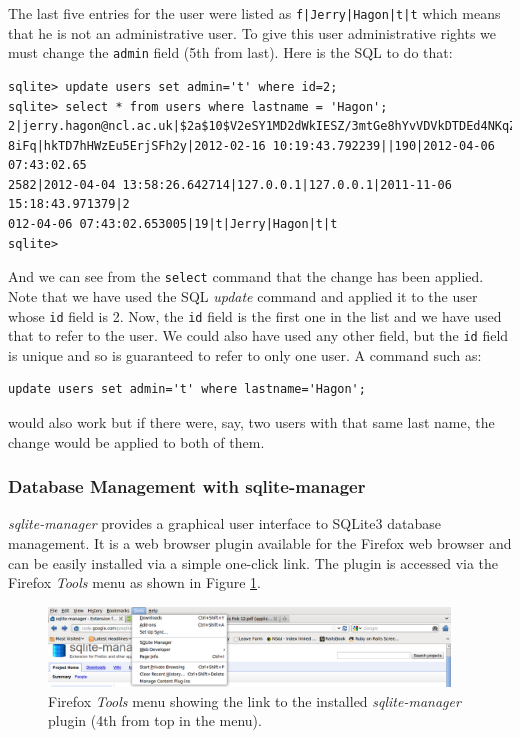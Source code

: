 \documentclass[12pt,twoside]{article}
\begin{document}
The last five entries for the user were listed as \verb=f|Jerry|Hagon|t|t=
which means that he is not an administrative user. To give this user
administrative rights we must change the \verb=admin= field (5th from last).
Here is the SQL to do that:

\small
\begin{verbatim}
sqlite> update users set admin='t' where id=2;
sqlite> select * from users where lastname = 'Hagon';
2|jerry.hagon@ncl.ac.uk|$2a$10$V2eSY1MD2dWkIESZ/3mtGe8hYvVDVkDTDEd4NKqZOQJ3t9wg9
8iFq|hkTD7hHWzEu5ErjSFh2y|2012-02-16 10:19:43.792239||190|2012-04-06 07:43:02.65
2582|2012-04-04 13:58:26.642714|127.0.0.1|127.0.0.1|2011-11-06 15:18:43.971379|2
012-04-06 07:43:02.653005|19|t|Jerry|Hagon|t|t
sqlite> 
\end{verbatim}
\normalsize
 
And we can see from the \verb=select= command that the change has been applied.
Note that we have used the SQL \emph{update} command and applied it to the
user whose \verb=id= field is 2. Now, the \verb=id= field
is the first one in the list and we have used that to refer to the user.
We could also have used any other field, but the \verb=id=  field is unique
and so is guaranteed to refer to only one user. A command such as:
\begin{verbatim}
update users set admin='t' where lastname='Hagon';
\end{verbatim}
would also work but if there were, say, two users with that same last name, 
the change would be applied to both of them.

\subsubsection{Database Management with sqlite-manager}
\emph{sqlite-manager} provides a graphical user interface to SQLite3
database management. It is a web browser plugin available for the Firefox
web browser and can be easily installed via a
simple one-click link\cite{sqlitemanager}.
The plugin is accessed via the Firefox \emph{Tools} menu as shown in
Figure \ref{fig:firefoxtools}.

\begin{figure}[!htb]
\begin{center}
\includegraphics[width=0.95\textwidth]{firefoxtools}
\caption{Firefox \emph{Tools} menu showing the link to the installed
\emph{sqlite-manager} plugin (4th from top in the menu).
\label{fig:firefoxtools}}
\end{center}
\end{figure}
\end{document}
